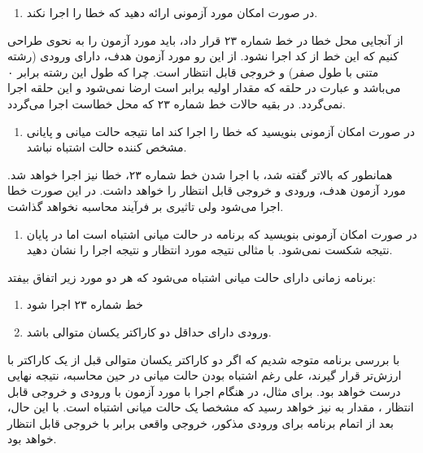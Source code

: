 \documentclass{article}
\newenvironment{answer}{}{\\[.3ex]}
\newenvironment{qitem}[1]{%
	\begin{enumerate}\item[(#1)]}{\end{enumerate}}
\begin{document}
\begin{qitem}{b}
در صورت امکان مورد آزمونی ارائه دهید که خطا را اجرا نکند.
\end{qitem}
\begin{answer}
از آنجایی محل خطا در خط شماره ۲۳ قرار داد، باید مورد آزمون را به نحوی طراحی کنیم که این خط از کد اجرا نشود. از این رو مورد آزمون هدف، دارای ورودی  (رشته متنی با طول صفر) و خروجی قابل انتظار  است. چرا که طول این رشته برابر ۰ می‌باشد و عبارت  در حلقه  که مقدار اولیه  برابر  است ارضا نمی‌شود و این حلقه اجرا نمی‌گردد.
در بقیه حالات خط شماره ۲۳ که محل خطاست اجرا می‌گردد.
\end{answer}
\begin{qitem}{c}
در صورت امکان آزمونی بنویسید که خطا را اجرا کند اما نتیجه حالت میانی و پایانی مشخص کننده حالت اشتباه نباشد.
\end{qitem}
\begin{answer}
همانطور که بالاتر گفته شد، با اجرا شدن خط شماره ۲۳، خطا نیز اجرا خواهد شد. مورد آزمون هدف، ورودی  و خروجی قابل انتظار  را خواهد داشت. در این صورت خطا اجرا می‌شود ولی تاثیری بر فرآیند محاسبه نخواهد گذاشت.
\end{answer}
\begin{qitem}{d}
در صورت امکان آزمونی بنویسید که برنامه در حالت میانی اشتباه است اما در پایان نتیجه شکست نمی‌شود. با مثالی نتیجه مورد انتظار و نتیجه اجرا را نشان دهید.
\end{qitem}
\begin{answer}
برنامه زمانی دارای حالت میانی اشتباه می‌شود که هر دو مورد زیر اتفاق بیفتد:
\begin{enumerate}
	\item خط شماره ۲۳ اجرا شود
	\item ورودی دارای حداقل دو کاراکتر یکسان متوالی باشد.
\end{enumerate}
با بررسی برنامه متوجه شدیم که اگر دو کاراکتر یکسان متوالی قبل از یک کاراکتر با ارزش‌تر قرار گیرند، علی رغم اشتباه بودن حالت میانی در حین محاسبه، نتیجه نهایی درست خواهد بود. برای مثال، در هنگام اجرا با مورد آزمون با ورودی  و خروجی قابل انتظار ، مقدار  به  نیز خواهد رسید که مشخصا یک حالت میانی اشتباه است. با این حال، بعد از اتمام برنامه برای ورودی مذکور، خروجی واقعی برابر با خروجی قابل انتظار خواهد بود.
\end{answer}
\end{document}
